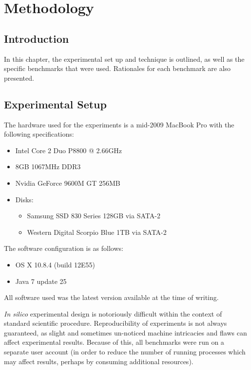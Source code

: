 \chapter{Methodology} \label{chp:methodology}
\section{Introduction} \label{sec:methodology/introduction}
In this chapter, the experimental set up and technique is outlined, as well as the specific benchmarks that were used. Rationales for each benchmark are also presented.

\section{Experimental Setup} \label{sec:methodology/setup}
The hardware used for the experiments is a mid-2009 MacBook Pro with the following specifications:
	
\begin{itemize}
	\item Intel Core 2 Duo P8800 @ 2.66GHz
	\item 8GB 1067MHz DDR3
	\item Nvidia GeForce 9600M GT 256MB
	\item Disks:
	\begin{itemize}
		\item Samsung SSD 830 Series 128GB via SATA-2
		\item Western Digital Scorpio Blue 1TB via SATA-2
	\end{itemize}
\end{itemize}

The software configuration is as follows:
\begin{itemize}
	\item OS X 10.8.4 (build 12E55)
	\item Java 7 update 25
\end{itemize}

All software used was the latest version available at the time of writing.

\textit{In silico} experimental design is notoriously difficult within the context of standard scientific procedure. Reproducibility of experiments is not always guaranteed, as slight and sometimes un-noticed machine intricacies and flaws can affect experimental results. Because of this, all benchmarks were run on a separate user account (in order to reduce the number of running processes which may affect results, perhaps by consuming additional resources).

